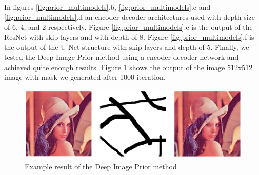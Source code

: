 In figures \ref{fig:prior_multimodels}.b, \ref{fig:prior_multimodels}.c and \ref{fig:prior_multimodels}.d an encoder-decoder architectures used with depth size of 6, 4, and 2 respectively. Figure \ref{fig:prior_multimodels}.e is the output of the ResNet with skip layers and with depth of 8. Figure \ref{fig:prior_multimodels}.f is the output of the U-Net structure with skip layers and depth of 5. Finally, we tested the Deep Image Prior method using a encoder-decoder network and achieved quite enough results. Figure \ref{fig:prior_lenna} shows the output of the image 512x512 image with mask we generated after 1000 iteration.

\begin{figure}[h]
    \centering
    \includegraphics[width=13cm]{figures/chapter4/impriorout.png}
    \caption{Example result of the Deep Image Prior method}
    \label{fig:prior_lenna}
\end{figure}
